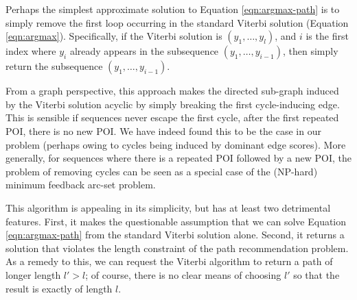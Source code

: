 
Perhaps the simplest approximate solution to Equation \ref{eqn:argmax-path} is to simply remove the first loop occurring in the standard Viterbi solution (Equation \ref{eqn:argmax}).
Specifically, if the Viterbi solution is $( y_1, \ldots, y_l )$,
and $i$ is the first index where $y_i$ already appears in the subsequence $( y_1, \ldots, y_{i-1} )$,
then simply return the subsequence $( y_1, \ldots, y_{i-1} )$.

From a graph perspective, this approach makes the directed sub-graph induced by the Viterbi solution acyclic
by simply breaking the first cycle-inducing edge.
This is sensible if sequences never escape the first cycle, \ie after the first repeated POI, there is no new POI.
We have indeed found this to be the case in our problem (perhaps owing to cycles being induced by dominant edge scores).
More generally, for sequences %
where there is a repeated POI followed by a new POI,
the problem of removing cycles can be seen as a special case of the ({\sf NP}-hard) minimum feedback arc-set problem.

This algorithm is appealing in its simplicity,
but has at least two detrimental features.
First, it makes the questionable assumption that we can solve Equation \ref{eqn:argmax-path} from the standard Viterbi solution alone.
Second, it returns a solution that violates the length constraint of the path recommendation problem.
As a remedy to this, we can request the Viterbi algorithm to return a path of longer length $l' > l$;
of course, there is no clear means of choosing $l'$ so that the result is exactly of length $l$.

